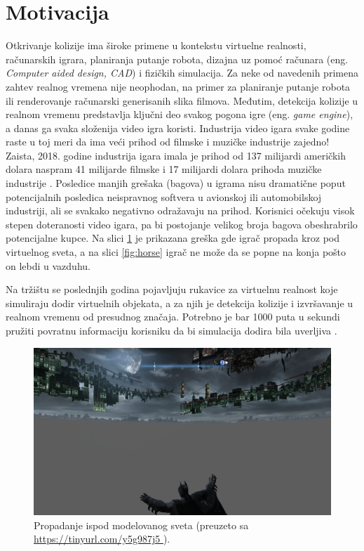 \documentclass[12pt,oneside]{memoir}
\begin{document}
\section{Motivacija}
\label{sec:naslov1}
Otkrivanje kolizije ima široke primene u kontekstu virtuelne realnosti, računarskih igrara, planiranja putanje robota,
dizajna uz pomoć računara (eng. {\em Computer aided design, CAD}) i fizičkih simulacija. 
Za neke od navedenih primena zahtev realnog vremena nije neophodan, na primer za planiranje putanje robota ili renderovanje računarski generisanih slika filmova.
Međutim, detekcija kolizije u realnom vremenu predstavlja ključni deo svakog pogona igre (eng. {\em game engine}), a danas ga svaka složenija
video igra koristi. Industrija video igara svake godine raste \cite{game_industry}
u toj meri da ima veći prihod od filmske i muzičke industrije zajedno! Zaista, 2018. godine industrija igara imala je prihod od
137 milijardi američkih dolara naspram 41 milijarde filmske i 17 milijardi dolara prihoda muzičke industrije \cite{movie, music, game_industry}.
Posledice manjih grešaka (bagova) u igrama nisu dramatične poput potencijalnih posledica neispravnog softvera u avionskoj ili automobilskoj industriji, ali 
se svakako negativno odražavaju na prihod.
Korisnici očekuju visok stepen doteranosti video igara, pa bi postojanje velikog broja bagova 
obeshrabrilo potencijalne kupce. Na slici \ref{fig:batman} je prikazana greška gde igrač propada kroz
pod virtuelnog sveta, a na slici \ref{fig:horse} igrač ne može da se popne na konja pošto on lebdi u vazduhu.

Na tržištu se poslednjih godina pojavljuju rukavice za virtuelnu realnost koje simuliraju dodir virtuelnih objekata, a za njih je 
detekcija kolizije i izvršavanje u realnom vremenu od presudnog značaja.
Potrebno je bar 1000 puta u sekundi pružiti povratnu informaciju korisniku da bi simulacija dodira bila uverljiva \cite{haptic}. 

\begin{figure}
\centering
\includegraphics[scale=0.22]{batman.jpg}
\caption{Propadanje ispod modelovanog sveta (preuzeto sa \url{ https://tinyurl.com/y5g987j5 }).}
\label{fig:batman}
\end{figure}
\end{document}
